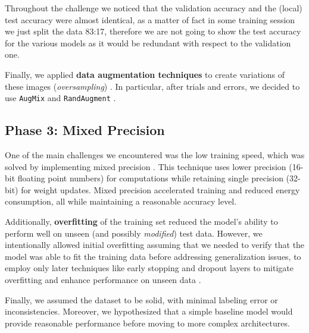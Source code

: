 \documentclass[11pt]{article}
\begin{document}
\begin{multicols*}{2}
        Throughout the challenge we noticed that the validation accuracy and the (local) test accuracy were almost identical, as a matter of fact in some training session we just split the data 83:17, therefore we are not going to show the test accuracy for the various models as it would be redundant with respect to the validation one.

        Finally, we applied \textbf{data augmentation techniques} to create variations of these images (\textit{oversampling}) \cite{oversampling}. In particular, after trials and errors, we decided to use \texttt{AugMix} and \texttt{RandAugment} \cite{aug}.

        

        \subsection{Phase 3: Mixed Precision}

        One of the main challenges we encountered was the low training speed, which was solved by implementing mixed precision \cite{mixed-precision}. This technique uses lower precision (16-bit floating point numbers) for computations while retaining single precision (32-bit) for weight updates. Mixed precision accelerated training and reduced energy consumption, all while maintaining a reasonable accuracy level. 
        
        Additionally, \textbf{overfitting} of the training set reduced the model's ability to perform well on unseen (and possibly \textit{modified}) test data. However, we intentionally allowed initial overfitting assuming that we needed to verify that the model was able to fit the training data before addressing generalization issues, to employ only later techniques like early stopping and dropout layers to mitigate overfitting and enhance performance on unseen data \cite{overfitting}.

        Finally, we assumed the dataset to be solid, with minimal labeling error or inconsistencies. Moreover, we hypothesized that a simple baseline model would provide reasonable performance before moving to more complex architectures. 




\end{multicols*}
\end{document}
